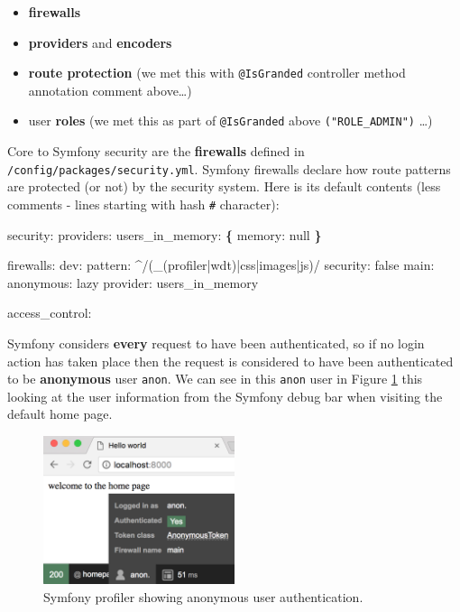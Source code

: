\documentclass[a4paperpaper,openright]{book}
\newenvironment{Shaded}{}{}
\newcommand{\AttributeTok}[1]{\textcolor[rgb]{0.49,0.56,0.16}{#1}}
\newcommand{\CharTok}[1]{\textcolor[rgb]{0.25,0.44,0.63}{#1}}
\newcommand{\FunctionTok}[1]{\textcolor[rgb]{0.02,0.16,0.49}{#1}}
\newcommand{\KeywordTok}[1]{\textcolor[rgb]{0.00,0.44,0.13}{\textbf{#1}}}
\providecommand{\tightlist}{%
  \setlength{\itemsep}{0pt}\setlength{\parskip}{0pt}}
\begin{document}
\begin{itemize}
\tightlist
\item
  \textbf{firewalls}
\item
  \textbf{providers} and \textbf{encoders}
\item
  \textbf{route protection} (we met this with \texttt{@IsGranded}
  controller method annotation comment above\ldots{})
\item
  user \textbf{roles} (we met this as part of \texttt{@IsGranded} above
  \texttt{("ROLE\_ADMIN")} \ldots{})
\end{itemize}

Core to Symfony security are the \textbf{firewalls} defined in
\texttt{/config/packages/security.yml}. Symfony firewalls declare how
route patterns are protected (or not) by the security system. Here is
its default contents (less comments - lines starting with hash
\texttt{\#} character):

\begin{Shaded}
\begin{Highlighting}[]
    \FunctionTok{security:}
        \FunctionTok{providers:}
            \FunctionTok{users_in_memory:}\AttributeTok{ }\KeywordTok{\{} \FunctionTok{memory:}\AttributeTok{ }\CharTok{null}\AttributeTok{ }\KeywordTok{\}}

        \FunctionTok{firewalls:}
            \FunctionTok{dev:}
                \FunctionTok{pattern:}\AttributeTok{ ^/(_(profiler|wdt)|css|images|js)/}
                \FunctionTok{security:}\AttributeTok{ }\CharTok{false}
            \FunctionTok{main:}
                \FunctionTok{anonymous:}\AttributeTok{ lazy}
                \FunctionTok{provider:}\AttributeTok{ users_in_memory}
    
        \FunctionTok{access_control:}
\end{Highlighting}
\end{Shaded}

Symfony considers \textbf{every} request to have been authenticated, so
if no login action has taken place then the request is considered to
have been authenticated to be \textbf{anonymous} user \texttt{anon}. We
can see in this \texttt{anon} user in Figure \ref{anon_user} this
looking at the user information from the Symfony debug bar when visiting
the default home page.

\begin{figure}
\centering
\includegraphics[width=0.5\textwidth,height=\textheight]{./tex2pdf.-65f13e14688ab55b/6888b9386404a3f170783e9672b48cf40ecc274c.png}
\caption{Symfony profiler showing anonymous user authentication.
\label{anon_user}}
\end{figure}
\end{document}
